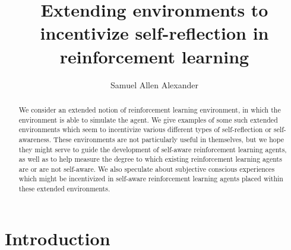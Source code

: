 \documentclass[runningheads]{llncs}
\begin{document}
\title{Extending environments to incentivize self-reflection
in reinforcement learning}

\author{Samuel Allen Alexander}

\maketitle

\begin{abstract}
    We consider an extended notion
    of reinforcement learning environment, in which the environment is able
    to simulate the agent. We give
    examples of some such extended environments which seem to incentivize
    various different types of self-reflection or self-awareness.
    These environments are not particularly useful in themselves, but we
    hope they might serve to guide the development of self-aware reinforcement
    learning agents, as well as to help measure the degree to which existing
    reinforcement learning agents are or are not self-aware. We also speculate
    about subjective conscious experiences which
    might be incentivized in self-aware reinforcement learning agents
    placed within these extended environments.
\end{abstract}

\section{Introduction}
\end{document}
